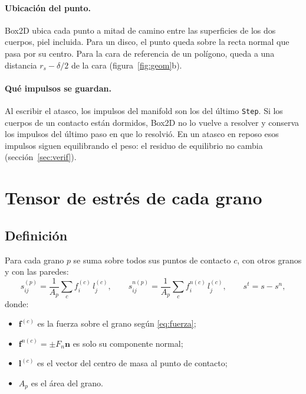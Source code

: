 \documentclass[11pt,a4paper]{article}
\newcommand{\vect}[1]{\mathbf{#1}}
\newcommand{\n}{\vect{n}}
\newcommand{\lv}{\vect{l}}
\newcommand{\f}{\vect{f}}
\newcommand{\codeus}{\textunderscore\allowbreak}
\newcommand{\code}[1]{\texttt{\begingroup\let\_\codeus#1\endgroup}}
\begin{document}
\paragraph{Ubicación del punto.} Box2D ubica cada punto a mitad de camino
entre las superficies de los dos cuerpos, piel incluida. Para un disco,
el punto queda sobre la recta normal que pasa por su centro. Para la cara
de referencia de un polígono, queda a una distancia $r_s - \delta/2$ de
la cara (figura~\ref{fig:geom}b).

\paragraph{Qué impulsos se guardan.} Al escribir el atasco, los impulsos
del manifold son los del último \code{Step}. Si los cuerpos de un contacto
están dormidos, Box2D no lo vuelve a resolver y conserva los impulsos del
último paso en que lo resolvió. En un atasco en reposo esos impulsos
siguen equilibrando el peso: el residuo de equilibrio no cambia
(sección~\ref{sec:verif}).

\section{Tensor de estrés de cada grano}
\label{sec:tensor}

\subsection{Definición}

Para cada grano $p$ se suma sobre todos sus puntos de contacto $c$, con
otros granos y con las paredes:
\begin{equation}
  s^{(p)}_{ij} = \frac{1}{A_p}\sum_c f^{(c)}_i\, l^{(c)}_j, \qquad
  s^{n(p)}_{ij} = \frac{1}{A_p}\sum_c f^{n(c)}_i\, l^{(c)}_j, \qquad
  s^t = s - s^n,
  \label{eq:love}
\end{equation}
donde:
\begin{itemize}
  \item $\f^{(c)}$ es la fuerza sobre el grano según \eqref{eq:fuerza};
  \item $\f^{n(c)} = \pm F_n\n$ es solo su componente normal;
  \item $\lv^{(c)}$ es el vector del centro de masa al punto de contacto;
  \item $A_p$ es el área del grano.
\end{itemize}
\end{document}
